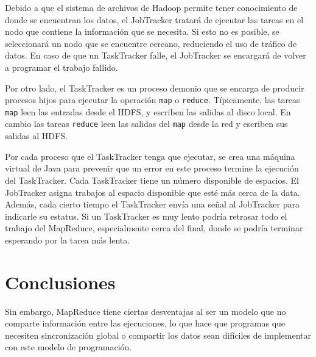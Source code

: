 \documentclass[conference]{IEEEtran}
\begin{document}
Debido a que el sistema de archivos de Hadoop permite tener conocimiento de donde se encuentran los datos, el JobTracker tratará de ejecutar las tareas en el nodo que contiene la información que se necesita. 
Si esto no es posible, se seleccionará un nodo que se encuentre cercano, reduciendo el uso de tráfico de datos.
En caso de que un TaskTracker falle, el JobTracker se encargará de volver a programar el trabajo fallido.


Por otro lado, el TaskTracker es un proceso demonio que se encarga de producir procesos hijos para  ejecutar la operación \texttt{map} o \texttt{reduce}.
Típicamente, las tareas \texttt{map} leen las entradas desde el HDFS, y escriben las salidas al disco local. 
En cambio las tareas \texttt{reduce} leen las salidas del \texttt{map} desde la red y escriben sus salidas al HDFS.


Por cada proceso que el TaskTracker tenga que ejecutar, se crea una máquina virtual de Java para prevenir que un error en este proceso termine la ejecución del TaskTracker.
Cada TaskTracker tiene un número disponible de espacios.
El JobTracker asigna trabajos al espacio disponible que esté más cerca de la data.
Además, cada cierto tiempo el TaskTracker envía una señal al JobTracker para indicarle su estatus. 
Si un TaskTracker es muy lento podría retrasar todo el trabajo del MapReduce, especialmente cerca del final, donde se podría terminar esperando por la tarea más lenta.






\section{Conclusiones}
\label{conclu}



Sin embargo, MapReduce tiene ciertas desventajas al ser un modelo que no comparte información entre las ejecuciones, lo que hace que programas que necesiten sincronización global o compartir los datos sean difíciles de implementar con este modelo de programación.





\end{document}
